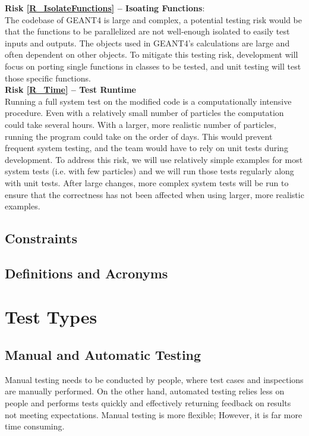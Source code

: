 \documentclass[12pt]{article}
\begin{document}
\textbf{Risk \ref{R_IsolateFunctions} -- Isoating Functions}:\\
The codebase of GEANT4 is large and complex, a potential testing risk would be that the functions to be parallelized are not well-enough isolated to easily test inputs and outputs. The objects used in GEANT4's calculations are large and often dependent on other objects. To mitigate this testing risk, development will focus on porting single functions in classes to be tested, and unit testing will test those specific functions.\\

\textbf{Risk \ref{R_Time} -- Test Runtime}\\
Running a full system test on the modified code is a computationally intensive procedure. Even with a relatively small number of particles the computation could take several hours. With a larger, more realistic number of particles, running the program could take on the order of days. This would prevent frequent system testing, and the team would have to rely on unit tests during development. To address this risk, we will use relatively simple examples for most system tests (i.e. with few particles) and we will run those tests regularly along with unit tests. After large changes, more complex system tests will be run to ensure that the correctness has not been affected when using larger, more realistic examples.

\subsection{Constraints} %

\subsection{Definitions and Acronyms} %

\section{Test Types}

\subsection{Manual and Automatic Testing} %
Manual testing needs to be conducted by people, where test cases and inspections are manually performed. On the other hand, automated testing relies less on people and performs tests quickly and effectively returning feedback on results not meeting expectations. Manual testing is more flexible; However, it is far more time consuming.\\
\end{document}
